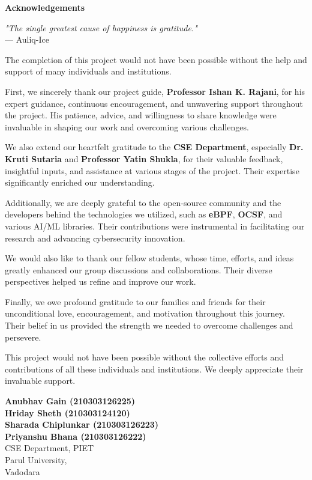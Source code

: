 \thispagestyle{empty}
\newpage
\cleardoublepage{}
{}
\begin{center}
{\Large \bf Acknowledgements}\\
\end{center}
\vspace{10pt}

\begin{flushright}
\textit{"The single greatest cause of happiness is gratitude."}\\
\vspace{5mm}
— Auliq-Ice
\end{flushright}

The completion of this project would not have been possible without the help and support of many individuals and institutions. 

First, we sincerely thank our project guide, \textbf{Professor Ishan K. Rajani}, for his expert guidance, continuous encouragement, and unwavering support throughout the project. His patience, advice, and willingness to share knowledge were invaluable in shaping our work and overcoming various challenges. 

We also extend our heartfelt gratitude to the \textbf{CSE Department}, especially \textbf{Dr. Kruti Sutaria} and \textbf{Professor Yatin Shukla}, for their valuable feedback, insightful inputs, and assistance at various stages of the project. Their expertise significantly enriched our understanding.

Additionally, we are deeply grateful to the open-source community and the developers behind the technologies we utilized, such as \textbf{eBPF}, \textbf{OCSF}, and various AI/ML libraries. Their contributions were instrumental in facilitating our research and advancing cybersecurity innovation.

We would also like to thank our fellow students, whose time, efforts, and ideas greatly enhanced our group discussions and collaborations. Their diverse perspectives helped us refine and improve our work.

Finally, we owe profound gratitude to our families and friends for their unconditional love, encouragement, and motivation throughout this journey. Their belief in us provided the strength we needed to overcome challenges and persevere. 

This project would not have been possible without the collective efforts and contributions of all these individuals and institutions. We deeply appreciate their invaluable support.

\vspace{1.5cm}
\begin{flushright}
\textbf{Anubhav Gain (210303126225)}\\
\textbf{Hriday Sheth (210303124120)}\\
\textbf{Sharada Chiplunkar (210303126223)}\\
\textbf{Priyanshu Bhana (210303126222)}\\
CSE Department, PIET\\
Parul University,\\
Vadodara
\end{flushright}
